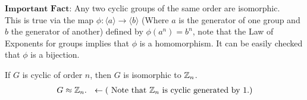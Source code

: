 \noindent$\boxed{\textbf{Important Fact:}}$ Any two cyclic groups of the same order are
isomorphic.\\
This is true via the map $\phi: \langle a\rangle \rightarrow \langle b \rangle $ (Where $a$ is the
generator of one group and $b$ the generator of another) defined by $\phi(a^n)=b^n$, note that the
Law of Exponents for groups implies that $\phi$ is a homomorphism. It can be easily checked that
$\phi$ is a bijection. \steezybreak

\begin{corollary}
If $G$ is cyclic of order $n$, then $G$ is isomorphic to ${\mathbb{Z}}_n$.\\
\begin{align}
    G\approx {\mathbb{Z}}_n . \ \ \leftarrow (\text{ Note that }{\mathbb{Z}}_n \text{ is cyclic generated by } 1.)\nonumber
\end{align}
\end{corollary}

